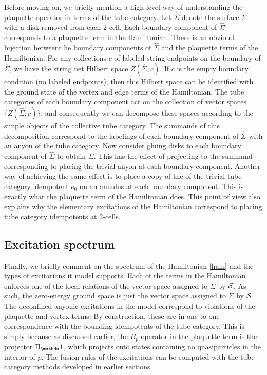 \medskip


Before moving on, we briefly mention a 
high-level way of understanding the plaquette operator in terms of the tube category.
Let $\widehat\Sigma$ denote the surface $\Sigma$ with a disk removed from each 2-cell.
Each boundary component of $\widehat\Sigma$ corresponds to a plaquette term in the Hamiltonian. 
There is an obvioud bijection betweent he boundary components of $\widehat\Sigma$ and the plaquette terms of the Hamiltonian.
For any collections $c$ of labeled string endpoints on the boundary of $\widehat\Sigma$, we have
the string net Hilbert space $Z(\widehat\Sigma; c)$.
If $c$ is the empty boundary condition (no labeled endpoints), then this Hilbert space can be identified with
the ground state of the vertex and edge terms of the Hamiltonian.
The tube categories of each boundary component act on the collection of vector spaces $\{Z(\widehat\Sigma; c)\}$,
and consequently we can decompose these spaces according to the simple objects of the collective tube category.
The summands of this decomposition correspond to the labelings of each boundary component of $\widehat\Sigma$ with an
anyon of the tube category.
Now consider gluing disks to each boundary component of $\widehat\Sigma$ to obtain $\Sigma$.
This has the effect of projecting to the summand corresponding to placing the trivial anyon at each boundary component.
Another way of achieving the same effect is to place a copy of the of the trivial tube category idempotent $e_0$
on an annulus at each boundary component.
This is exactly what the plaquette term of the Hamiltonian does.
This point of view also explains why the elementary excitations of the Hamiltonian
correspond to placing tube category idempotents at 2-cells.






\subsection{Excitation spectrum} \label{excitations_of_H}

Finally, we briefly comment on the spectrum of the Hamiltonian \eqref{ham} and the types of excitations it model supports. 
Each of the terms in the Hamiltonian enforces one of the local relations of the vector space assigned to $\Sigma$ by $\mathcal{S}$. 
As such, the zero-energy ground space is just the vector space assigned to $\Sigma$ by $\mathcal{S}$.
The deconfined anyonic excitations in the model correspond to violations of the plaquette and vertex terms.
By construction, these are in one-to-one correspondence with the bounding idempotents of the tube category.
This is simply because as discussed earlier, the $B_p$ operator in the plaquette term is the projector $\Pi_\unit$, which projects onto states containing no quasiparticles in the interior of $p$. 
The fusion rules of the excitations can be computed with the tube category methods developed in earlier sections. 

